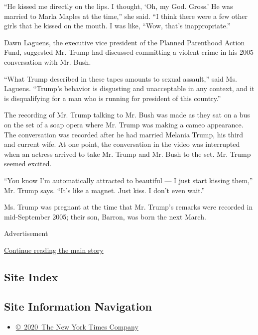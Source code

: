 ``He kissed me directly on the lips. I thought, `Oh, my God. Gross.' He
was married to Marla Maples at the time,'' she said. ``I think there
were a few other girls that he kissed on the mouth. I was like, ``Wow,
that's inappropriate.''

Dawn Laguens, the executive vice president of the Planned Parenthood
Action Fund, suggested Mr. Trump had discussed committing a violent
crime in his 2005 conversation with Mr. Bush.

``What Trump described in these tapes amounts to sexual assault,'' said
Ms. Laguens. ``Trump's behavior is disgusting and unacceptable in any
context, and it is disqualifying for a man who is running for president
of this country.''

The recording of Mr. Trump talking to Mr. Bush was made as they sat on a
bus on the set of a soap opera where Mr. Trump was making a cameo
appearance. The conversation was recorded after he had married Melania
Trump, his third and current wife. At one point, the conversation in the
video was interrupted when an actress arrived to take Mr. Trump and Mr.
Bush to the set. Mr. Trump seemed excited.

``You know I'm automatically attracted to beautiful --- I just start
kissing them,'' Mr. Trump says. ``It's like a magnet. Just kiss. I don't
even wait.''

Ms. Trump was pregnant at the time that Mr. Trump's remarks were
recorded in mid-September 2005; their son, Barron, was born the next
March.

Advertisement

\protect\hyperlink{after-bottom}{Continue reading the main story}

\hypertarget{site-index}{%
\subsection{Site Index}\label{site-index}}

\hypertarget{site-information-navigation}{%
\subsection{Site Information
Navigation}\label{site-information-navigation}}

\begin{itemize}
\tightlist
\item
  \href{https://help.nytimes3xbfgragh.onion/hc/en-us/articles/115014792127-Copyright-notice}{©~2020~The
  New York Times Company}
\end{itemize}

